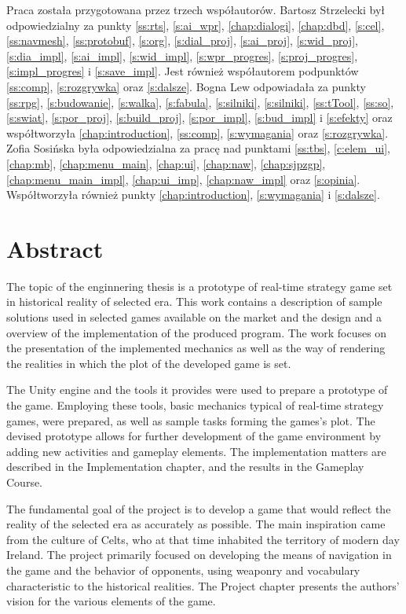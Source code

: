 Praca została przygotowana przez trzech współautorów. Bartosz Strzelecki był odpowiedzialny za punkty \ref{ss:rts},
\ref{s:ai_wpr}, \ref{chap:dialogi}, \ref{chap:dbd}, \ref{s:cel}, \ref{ss:navmesh}, \ref{ss:protobuf}, \ref{s:org},
\ref{s:dial_proj}, \ref{s:ai_proj}, \ref{s:wid_proj}, \ref{s:dia_impl}, \ref{s:ai_impl}, \ref{s:wid_impl}, \ref{s:wpr_progres}, \ref{s:proj_progres}, \ref{s:impl_progres} i
\ref{s:save_impl}. Jest również współautorem podpunktów \ref{ss:comp}, \ref{s:rozgrywka} oraz \ref{s:dalsze}. Bogna Lew
odpowiadała za punkty \ref{ss:rpg}, \ref{s:budowanie}, \ref{s:walka}, \ref{s:fabula}, \ref{s:silniki}, \ref{s:silniki},
\ref{ss:tTool}, \ref{ss:so}, \ref{s:swiat}, \ref{s:por_proj}, \ref{s:build_proj}, \ref{s:por_impl}, \ref{s:bud_impl} i
\ref{s:efekty} oraz współtworzyła \ref{chap:introduction}, \ref{ss:comp}, \ref{s:wymagania} oraz \ref{s:rozgrywka}.
Zofia Sosińska była odpowiedzialna za pracę nad punktami \ref{ss:tbs}, \ref{c:elem_ui}, \ref{chap:mb},
\ref{chap:menu_main}, \ref{chap:ui}, \ref{chap:naw}, \ref{chap:sjpzgp}, \ref{chap:menu_main_impl}, \ref{chap:ui_imp},
\ref{chap:naw_impl} oraz \ref{s:opinia}. Współtworzyła również punkty \ref{chap:introduction}, \ref{s:wymagania} i \ref{s:dalsze}.

\chapter*{Abstract}
The topic of the enginnering thesis is a prototype of real-time strategy game set in historical reality of selected era.
This work contains a description of sample solutions used in selected games available on the market
and the design and a overview of the implementation of the produced program. The work focuses on the presentation 
of the implemented mechanics as well as
the way of rendering the realities in which the plot of the developed game is set.

The Unity engine and the tools it provides were used to prepare a prototype of the game.
Employing these tools, basic mechanics typical of real-time strategy games, were prepared,
as well as sample tasks forming the games's plot. The devised prototype allows for 
further development of the game environment by adding new activities and gameplay elements.
The implementation matters are described in the Implementation chapter, and the results in the Gameplay Course.

The fundamental goal of the project is to develop a game that would reflect the reality of the selected era as accurately as possible.
The main inspiration came from the culture of Celts, who at that time inhabited the territory of modern day Ireland.
The project primarily focused on
developing the means of navigation in the game and the behavior of opponents, using weaponry and vocabulary characteristic to the
historical realities. The Project chapter presents the authors' vision for the various elements of the game.

